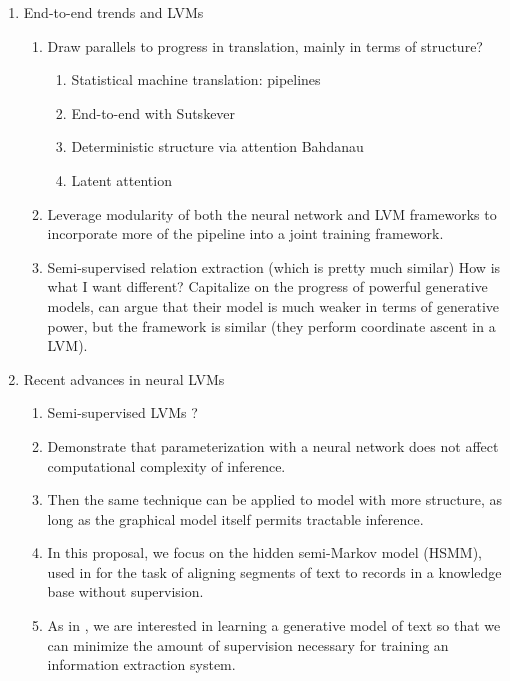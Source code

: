 \documentclass[11pt]{article}
\begin{document}
\begin{enumerate}
\begin{enumerate}
    \item End-to-end trends and LVMs
        \begin{enumerate}
        \item Draw parallels to progress in translation, mainly in terms of structure?
            \begin{enumerate}
            \item Statistical machine translation: pipelines
            \item End-to-end with Sutskever
            \item Deterministic structure via attention Bahdanau
            \item Latent attention \citet{deng2018attn}
            \end{enumerate}
        \item Leverage modularity of both the neural network and LVM frameworks
            to incorporate more of the pipeline into a joint training framework.
        \item \citet{qu2017ssre} Semi-supervised relation extraction (which is pretty much similar)
            How is what I want different? Capitalize on the progress of powerful generative models,
            can argue that their model is much weaker in terms of generative power,
            but the framework is similar (they perform coordinate ascent in a LVM).
        \end{enumerate}
    \item Recent advances in neural LVMs
        \begin{enumerate}
        \item Semi-supervised LVMs \citet{kingma2014ssvae}?
        \item Demonstrate that parameterization with a neural network does not affect computational
            complexity of inference.
        \item Then the same technique can be applied to model with more structure,
            as long as the graphical model itself permits tractable inference.
        \item In this proposal, we focus on the hidden semi-Markov model (HSMM),
            used in \citet{liang2009semalign} for the task of aligning segments of text to
            records in a knowledge base without supervision. 
        \item As in \citet{liang2009semalign}, we are interested in learning a generative model of text so that
            we can minimize the amount of supervision necessary for training an
            information extraction system.

\end{enumerate}
\end{enumerate}
\end{enumerate}
\end{document}
